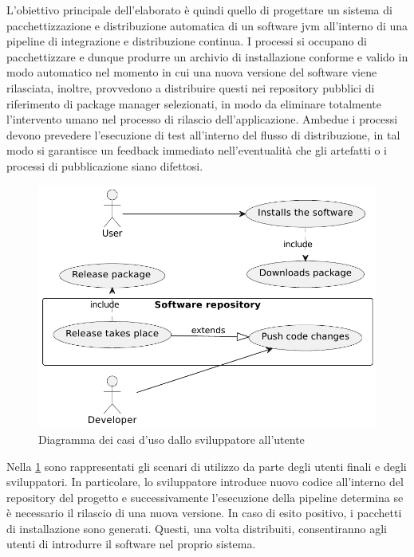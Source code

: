 L'obiettivo principale dell'elaborato è quindi quello di progettare un sistema di pacchettizzazione e distribuzione automatica di un software \ac{jvm} all'interno di una pipeline di integrazione e distribuzione continua. I processi si occupano di pacchettizzare e dunque produrre un archivio di installazione conforme e valido in modo automatico nel momento in cui una nuova versione del software viene rilasciata, inoltre, provvedono a distribuire questi nei repository pubblici di riferimento di package manager selezionati, in modo da eliminare totalmente l'intervento umano nel processo di rilascio dell'applicazione. Ambedue i processi devono prevedere l'esecuzione di test all'interno del flusso di distribuzione, in tal modo si garantisce un feedback immediato nell'eventualità che gli artefatti o i processi di pubblicazione siano difettosi.
\begin{figure}[htb]
	\centering
	\includegraphics[width=.75\linewidth]{figures/use-case-diagram.pdf}
	\caption{Diagramma dei casi d'uso dallo sviluppatore all'utente}
	\label{fig:use-case-diagram}
\end{figure}
Nella \cref{fig:use-case-diagram} sono rappresentati gli scenari di utilizzo da parte degli utenti finali e degli sviluppatori. In particolare, lo sviluppatore introduce nuovo codice all'interno del repository del progetto e successivamente l'esecuzione della pipeline determina se è necessario il rilascio di una nuova versione. In caso di esito positivo, i pacchetti di installazione sono generati. Questi, una volta distribuiti, consentiranno agli utenti di introdurre il software nel proprio sistema.